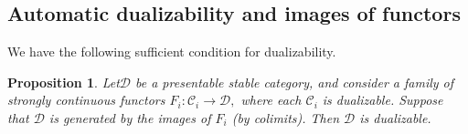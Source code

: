 \documentclass[11pt,leqno]{amsart}
\newtheorem{prop}[theo]{Proposition}
\numberwithin{equation}{section}
\newcommand{\st}{\operatorname{st}}
\newcommand{\cD}{{\mathcal D}}
\newcommand{\cC}{{\mathcal C}}
\begin{document}

\subsection{Automatic dualizability and images of functors}
\label{ssec:autom_dualizable}

We have the following sufficient condition for dualizability.

\begin{prop}\label{prop:condition_for_dualizability} Let$\cD$ be a presentable stable category, and consider a family of strongly continuous functors $F_i:\cC_i\to\cD,$ where each $\cC_i$ is dualizable. Suppose that $\cD$ is generated by the images of $F_i$ (by colimits). Then $\cD$ is dualizable.\end{prop}
\end{document}
